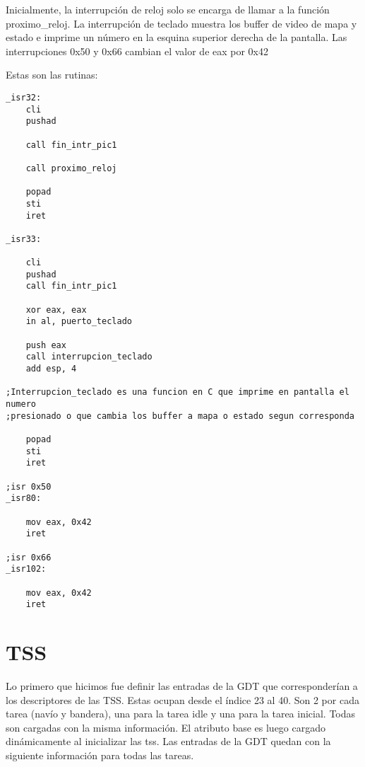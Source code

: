 \documentclass[10pt, a4paper]{article}
\begin{document}
Inicialmente, la interrupci\'on de reloj solo se encarga de llamar a la funci\'on proximo\_reloj. La interrupci\'on de teclado muestra los buffer de video
de mapa y estado e imprime un n\'umero en la esquina superior derecha de la pantalla. Las interrupciones 0x50 y 0x66 cambian el valor de eax por 0x42

Estas son las rutinas:

\begin{verbatim}
_isr32:
    cli
    pushad

    call fin_intr_pic1

    call proximo_reloj

    popad
    sti
    iret

_isr33:

    cli
    pushad
    call fin_intr_pic1
	
    xor eax, eax
    in al, puerto_teclado
	
    push eax
    call interrupcion_teclado
    add esp, 4
	
;Interrupcion_teclado es una funcion en C que imprime en pantalla el numero
;presionado o que cambia los buffer a mapa o estado segun corresponda

    popad
    sti
    iret

;isr 0x50
_isr80:

    mov eax, 0x42
	iret

;isr 0x66
_isr102:

    mov eax, 0x42
	iret

\end{verbatim}



\section{TSS}

Lo primero que hicimos fue definir las entradas de la GDT que corresponder\'ian a los descriptores de las TSS. Estas ocupan desde el \'indice
23 al 40. Son 2 por cada tarea (nav\'io y bandera), una para la tarea idle y una para la tarea inicial. Todas son cargadas con la misma informaci\'on.
El atributo base es luego cargado din\'amicamente al inicializar las tss. Las entradas de la GDT quedan con la siguiente informaci\'on para todas las tareas.
\end{document}
